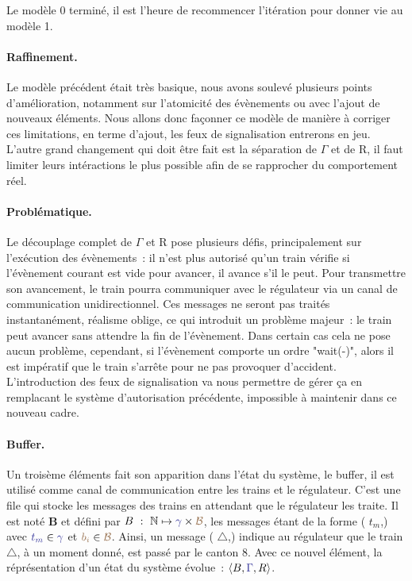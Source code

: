 \documentclass[oneside, a4paper, 11pt]{book}
\newcommand{\nats}{\ensuremath{\mathbb{N}}}
\newcommand{\trainFmt}[1]{{\color{traincolor} #1}}
\newcommand{\posFmt}[1]{{\color{poscolor}{#1}}}
\begin{document}
Le modèle 0 terminé, il est l'heure de recommencer l'itération pour donner vie au modèle 1.

\paragraph{Raffinement.} Le modèle précédent était très basique, nous avons soulevé plusieurs points d'amélioration, notamment sur l'atomicité des évènements ou avec l'ajout de nouveaux éléments. Nous allons donc façonner ce modèle de manière à corriger ces limitations, en terme d'ajout, les feux de signalisation entrerons en jeu.
L'autre grand changement qui doit être fait est la séparation de \trainFmt{$\Gamma$} et de R, il faut limiter leurs intéractions le plus possible afin de se rapprocher du comportement réel.

\paragraph{Problématique.} Le découplage complet de \trainFmt{$\Gamma$} et R pose plusieurs défis, principalement sur l'exécution des évènements~: il n'est plus autorisé qu'un train vérifie si l'évènement courant est vide pour avancer, il avance s'il le peut.
Pour transmettre son avancement, le train pourra communiquer avec le régulateur via un canal de communication unidirectionnel. Ces messages ne seront pas traités instantanément, réalisme oblige, ce qui introduit un problème majeur~: le train peut avancer sans attendre la fin de l'évènement.
Dans certain cas cela ne pose aucun problème, cependant, si l'évènement comporte un ordre "wait(-)", alors il est impératif que le train s'arrête pour ne pas provoquer d'accident.
L'introduction des feux de signalisation va nous permettre de gérer ça en remplacant le système d'autorisation précédente, impossible à maintenir dans ce nouveau cadre.

\paragraph{Buffer.} Un troisème éléments fait son apparition dans l'état du système, le buffer, il est utilisé comme canal de communication entre les trains et le régulateur. C'est une file qui stocke les messages des trains en attendant que le régulateur les traite. 
Il est noté \textbf{B} et défini par  $B~:~\nats \mapsto \trainFmt{\gamma} \times \posFmt{\mathcal{B}}$, les messages étant de la forme (\trainFmt{$t_m$},\posFmt{$b_i$}) avec $\trainFmt{t_m} \in \trainFmt{\gamma}$ et $\posFmt{b_i} \in \posFmt{\mathcal{B}}$.
Ainsi, un message (\trainFmt{$\triangle$},\posFmt{8}) indique au régulateur que le train $\triangle$, à un moment donné, est passé par le canton 8. Avec ce nouvel élément, la réprésentation d'un état du système évolue~: $\langle B, \trainFmt{\Gamma}, R\rangle$.
\end{document}
